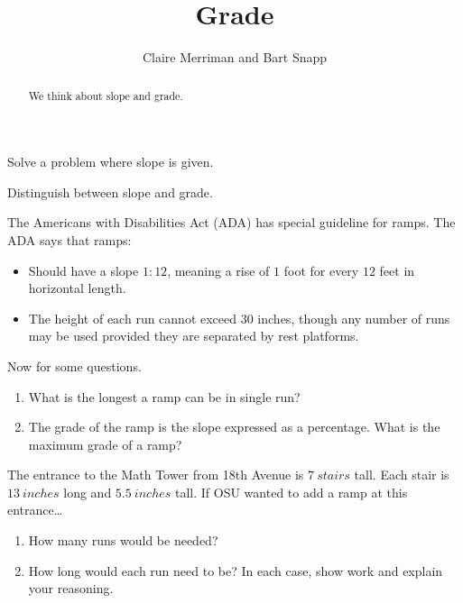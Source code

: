 \documentclass[noauthor,nooutcomes,hints,handout]{ximera}
\title{Grade}
\author{Claire Merriman and Bart Snapp}
\begin{document}
\begin{abstract}
  We think about slope and grade.
\end{abstract}
\maketitle

\begin{listOutcomes}
\item Solve a problem where slope is given.
\item Distinguish between slope and grade.
\end{listOutcomes}
\mynewpage

\begin{question}
  The Americans with Disabilities Act (ADA) has special guideline for
  ramps. The ADA says that ramps:
  \begin{itemize}
  \item Should have a slope $1:12$, meaning a rise of $1$ foot for
    every $12$ feet in horizontal length.
  \item The height of each run cannot exceed $30$ inches, though any
    number of runs may be used provided they are separated by rest
    platforms.
  \end{itemize}
  Now for some questions.
\begin{enumerate}
 \item What is the longest a ramp can be in single run?
 \item The grade of the ramp is the slope expressed as a percentage. What is the maximum grade of a ramp?
\end{enumerate}

\end{question}

\mynewpage

\begin{question}
The entrance to the Math Tower from 18th Avenue is $7\ stairs$
tall. Each stair is $13\ inches$ long and $5.5\ inches$ tall. If OSU
wanted to add a ramp at this entrance\dots
\begin{enumerate}
\item How many runs would be needed?
\item How long would each run need to be?  In each case, show work and
  explain your reasoning.
\end{enumerate}
\end{question}

\mynewpage
\end{document}
